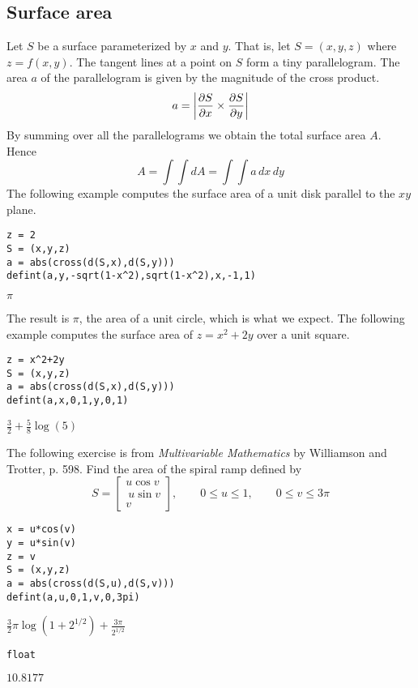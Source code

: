 
\subsection{Surface area}
Let $S$ be a surface parameterized by $x$ and $y$.
That is, let $S=(x,y,z)$ where $z=f(x,y)$.
The tangent lines at a point on $S$ form a tiny parallelogram.
The area $a$ of the parallelogram is given by the magnitude of the cross product.
$$a=\left|{\partial S\over\partial x}\times{\partial S\over\partial y}\right|$$
By summing over all the parallelograms we obtain the total surface area $A$.
Hence
$$A=\int\!\!\!\int dA=\int\!\!\!\int a\,dx\,dy$$
The following example computes the surface area of a unit disk
parallel to the $xy$ plane.

\begin{Verbatim}[formatcom=\color{blue},samepage=true]
z = 2
S = (x,y,z)
a = abs(cross(d(S,x),d(S,y)))
defint(a,y,-sqrt(1-x^2),sqrt(1-x^2),x,-1,1)
\end{Verbatim}

\noindent
$\displaystyle \pi$

\bigskip
\noindent
The result is $\pi$, the area of a unit circle, which is what we expect.
The following example computes the surface area of $z=x^2+2y$ over
a unit square.

\begin{Verbatim}[formatcom=\color{blue},samepage=true]
z = x^2+2y
S = (x,y,z)
a = abs(cross(d(S,x),d(S,y)))
defint(a,x,0,1,y,0,1)
\end{Verbatim}

\noindent
$\displaystyle \frac{3}{2}+\frac{5}{8}\log(5)$

\bigskip
\noindent
The following exercise is from
{\it Multivariable Mathematics} by Williamson and Trotter, p. 598.
Find the area of the spiral ramp defined by
$$S=\begin{bmatrix}u\cos v\\\ u\sin v\\ v\end{bmatrix},\qquad 0\le u\le1,\qquad 0\le v\le3\pi$$

\begin{Verbatim}[formatcom=\color{blue},samepage=true]
x = u*cos(v)
y = u*sin(v)
z = v
S = (x,y,z)
a = abs(cross(d(S,u),d(S,v)))
defint(a,u,0,1,v,0,3pi)
\end{Verbatim}

\noindent
$\displaystyle \frac{3}{2}\pi\log(1+2^{1/2})+\frac{3\pi}{2^{1/2}}$

\begin{Verbatim}[formatcom=\color{blue},samepage=true]
float
\end{Verbatim}

\noindent
$\displaystyle 10.8177$
